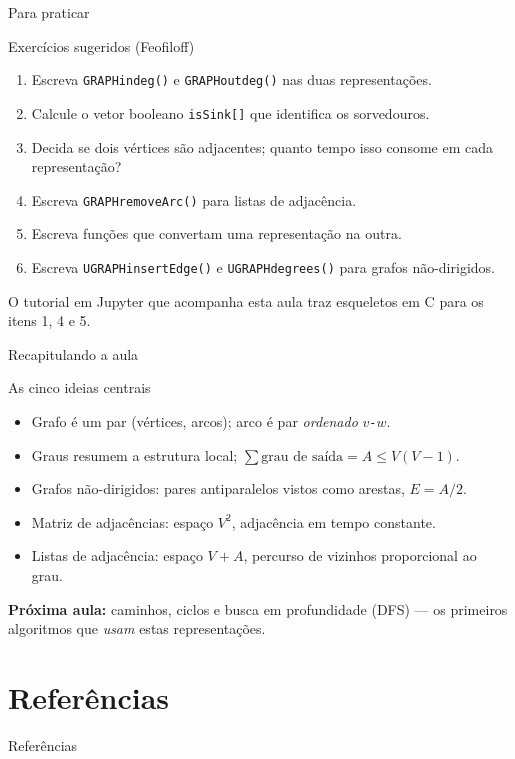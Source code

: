 \documentclass[aspectratio=169]{beamer}
\begin{document}
\begin{frame}{Para praticar}
  \begin{block}{Exercícios sugeridos (Feofiloff)}
    {\small
    \begin{enumerate}\small
      \item Escreva \texttt{GRAPHindeg()} e \texttt{GRAPHoutdeg()} nas duas representações.
      \item Calcule o vetor booleano \texttt{isSink[]} que identifica os sorvedouros.
      \item Decida se dois vértices são adjacentes; quanto tempo isso consome em cada representação?
      \item Escreva \texttt{GRAPHremoveArc()} para listas de adjacência.
      \item Escreva funções que convertam uma representação na outra.
      \item Escreva \texttt{UGRAPHinsertEdge()} e \texttt{UGRAPHdegrees()} para grafos não-dirigidos.
    \end{enumerate}}
  \end{block}
  {\scriptsize O tutorial em Jupyter que acompanha esta aula traz esqueletos em C
  para os itens 1, 4 e 5.}
\end{frame}

\begin{frame}{Recapitulando a aula}
  \begin{block}{As cinco ideias centrais}
    \begin{itemize}\small
      \item Grafo é um par (vértices, arcos); arco é par \emph{ordenado} $v$\texttt{-}$w$.
      \item Graus resumem a estrutura local; $\sum \text{grau de saída} = A \le V(V-1)$.
      \item Grafos não-dirigidos: pares antiparalelos vistos como arestas, $E = A/2$.
      \item Matriz de adjacências: espaço $V^2$, adjacência em tempo constante.
      \item Listas de adjacência: espaço $V+A$, percurso de vizinhos proporcional ao grau.
    \end{itemize}
  \end{block}
  {\small \textbf{Próxima aula:} caminhos, ciclos e busca em profundidade (DFS) ---
  os primeiros algoritmos que \emph{usam} estas representações.}
\end{frame}

\section*{Referências}
\begin{frame}[allowframebreaks]{Referências}
  \scriptsize
  \nocite{*}
  
  
\end{frame}
\end{document}
